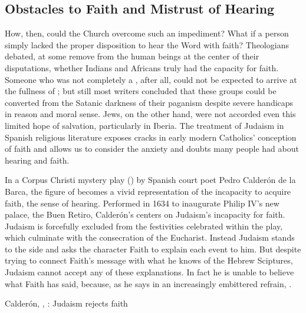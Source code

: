 \subsection{Obstacles to Faith and Mistrust of Hearing}

How, then, could the Church overcome such an impediment?
What if a person simply lacked the proper disposition to hear the Word with faith?
Theologians debated, at some remove from the human beings at the center of their disputations, whether Indians and Africans truly had the capacity for faith.%
\citXXX[Pagden?]
Someone who was not completely a , after all, could not be expected to arrive at the fullness of ; but still most writers concluded that these groups could be converted from the Satanic darkness of their paganism despite severe handicaps in reason and moral sense.
Jews, on the other hand, were not accorded even this limited hope of salvation, particularly in Iberia.%
\citXXX[Nemiroff?]
The treatment of Judaism in Spanish religious literature exposes cracks in early modern Catholics' conception of faith and allows us to consider the anxiety and doubts many people had about hearing and faith.

In a Corpus Christi mystery play () by Spanish court poet Pedro Calderón de la Barca, the figure of  becomes a vivid representation of the incapacity to acquire faith,  the sense of hearing.
Performed in 1634 to inaugurate Philip IV's new palace, the Buen Retiro, Calderón's  centers on Judaism's incapacity for faith.%
\autocite{Calderon:Retiro}
Judaism is forcefully excluded from the festivities celebrated within the play, which culminate with the consecration of the Eucharist.
Instead Judaism stands to the side and asks the character Faith to explain each event to him.
But despite trying to connect Faith's message with what he knows of the Hebrew Sciptures, Judaism cannot accept any of these explanations.
In fact he is unable to believe what Faith has said, because, as he says in an increasingly embittered refrain, .

\begin{expoem}
  \caption{Calderón, , : Judaism rejects faith}
  \label{expoem:Calderon-Retiro-Judaismo}
\end{expoem}

